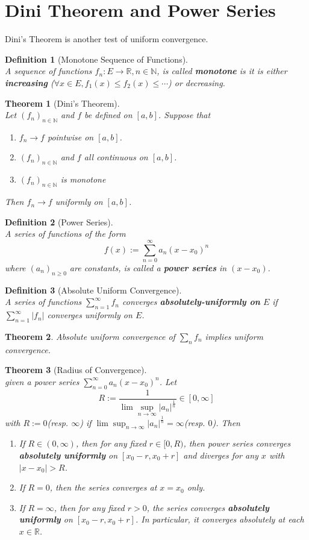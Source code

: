 \documentclass[12pt]{article}
\newtheorem{definition}{Definition}[section]
\newtheorem{theorem}{Theorem}[section]
\theoremstyle{definition}
\begin{document}
\section{Dini Theorem and Power Series}
Dini's Theorem is another test of uniform convergence.
\begin{definition}[Monotone Sequence of Functions]
\hfill\\\normalfont A sequence of functions $f_n:E\to\mathbb{R}, n\in\mathbb{N}$, is called \textbf{monotone} is it is either \textbf{increasing} ($\forall x\in E, f_1(x)\leq f_2(x)\leq \cdots$) or decreasing.
\end{definition}
\begin{theorem}[Dini's Theorem]
\hfill\\\normalfont Let $(f_n)_{n\in\mathbb{N}}$ and $f$ be defined on $[a,b]$. Suppose that
\begin{enumerate}
	\item $f_n\to f$ pointwise on $[a,b]$.
	\item $(f_n)_{n\in\mathbb{N}}$ and $f$ all continuous on $[a,b]$.
	\item $(f_n)_{n\in\mathbb{N}}$ is monotone
\end{enumerate}
Then $f_n\to f$ uniformly on $[a,b]$.
\end{theorem}
\begin{definition}[Power Series]
\hfill\\\normalfont A series of functions of the form
\[
f(x):=\sum_{n=0}^\infty a_n(x-x_0)^n
\]
where $(a_n)_{n\geq 0}$ are constants, is called a \textbf{power series} in $(x-x_0)$.
\end{definition}
\begin{definition}[Absolute Uniform Convergence]
\hfill\\\normalfont A series of functions $\sum_{n=1}^\infty f_n$ converges \textbf{absolutely-uniformly on} $E$ if $\sum_{n=1}^\infty|f_n|$ converges uniformly on $E$.
\end{definition}
\begin{theorem}\normalfont Absolute uniform convergence of $\sum_n f_n$ implies uniform convergence.\end{theorem}
\begin{theorem}[Radius of Convergence]
\hfill\\\normalfont given a power series $\sum_{n=0}^\infty a_n(x-x_0)^n$. Let
\[
R:=\frac{1}{\lim\sup_{n\to\infty}|a_n|^{\frac{1}{n}}}\in[0,\infty]
\]
with $R:=0$(resp. $\infty$) if $\lim\sup_{n\to\infty}|a_n|^{\frac{1}{n}}=\infty$(resp. $0$). Then
\begin{enumerate}
	\item If $R\in(0,\infty)$, then for any fixed $r\in[0,R)$, then power series converges \textbf{absolutely uniformly} on $[x_0-r,x_0+r]$ and diverges for any $x$ with $|x-x_0|>R$.
	\item If $R=0$, then the series converges at $x=x_0$ only.
	\item If $R=\infty$, then for any fixed $r>0$, the series converges \textbf{absolutely uniformly} on $[x_0-r,x_0+r]$. In particular, it converges absolutely at each $x\in\mathbb{R}$.
\end{enumerate}
\end{theorem}
\end{document}
